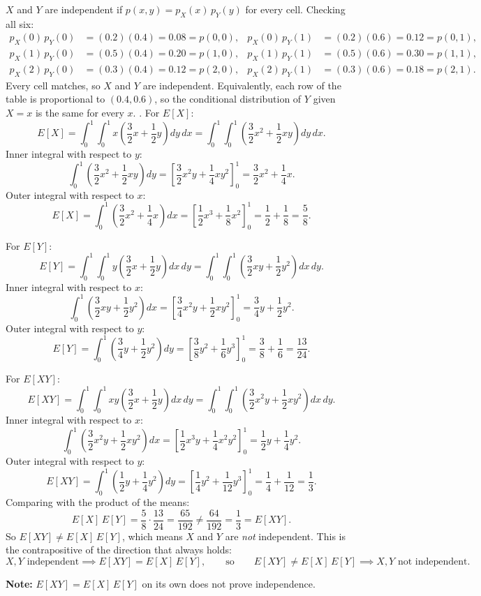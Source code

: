 \documentclass{article}
\begin{document}
$X$ and $Y$ are independent if $p(x, y) = p_X(x) \, p_Y(y)$ for every cell. Checking all six:
\begin{align*}
p_X(0) \, p_Y(0) &= (0.2)(0.4) = 0.08 = p(0, 0), & p_X(0) \, p_Y(1) &= (0.2)(0.6) = 0.12 = p(0, 1), \\
p_X(1) \, p_Y(0) &= (0.5)(0.4) = 0.20 = p(1, 0), & p_X(1) \, p_Y(1) &= (0.5)(0.6) = 0.30 = p(1, 1), \\
p_X(2) \, p_Y(0) &= (0.3)(0.4) = 0.12 = p(2, 0), & p_X(2) \, p_Y(1) &= (0.3)(0.6) = 0.18 = p(2, 1).
\end{align*}
Every cell matches, so $X$ and $Y$ are independent.
Equivalently, each row of the table is proportional to $(0.4, 0.6)$, so the conditional distribution of $Y$ given $X = x$ is the same for every $x$.
. For $E[X]$:
\[
E[X] = \int_0^1 \int_0^1 x \left( \frac{3}{2}x + \frac{1}{2}y \right) dy \, dx = \int_0^1 \int_0^1 \left( \frac{3}{2}x^2 + \frac{1}{2}xy \right) dy \, dx.
\]
Inner integral with respect to $y$:
\[
\int_0^1 \left( \frac{3}{2}x^2 + \frac{1}{2}xy \right) dy = \left[ \frac{3}{2}x^2 y + \frac{1}{4}x y^2 \right]_0^1 = \frac{3}{2}x^2 + \frac{1}{4}x.
\]
Outer integral with respect to $x$:
\[
E[X] = \int_0^1 \left( \frac{3}{2}x^2 + \frac{1}{4}x \right) dx = \left[ \frac{1}{2}x^3 + \frac{1}{8}x^2 \right]_0^1 = \frac{1}{2} + \frac{1}{8} = \frac{5}{8}.
\]

For $E[Y]$:
\[
E[Y] = \int_0^1 \int_0^1 y \left( \frac{3}{2}x + \frac{1}{2}y \right) dx \, dy = \int_0^1 \int_0^1 \left( \frac{3}{2}xy + \frac{1}{2}y^2 \right) dx \, dy.
\]
Inner integral with respect to $x$:
\[
\int_0^1 \left( \frac{3}{2}xy + \frac{1}{2}y^2 \right) dx = \left[ \frac{3}{4}x^2 y + \frac{1}{2}x y^2 \right]_0^1 = \frac{3}{4}y + \frac{1}{2}y^2.
\]
Outer integral with respect to $y$:
\[
E[Y] = \int_0^1 \left( \frac{3}{4}y + \frac{1}{2}y^2 \right) dy = \left[ \frac{3}{8}y^2 + \frac{1}{6}y^3 \right]_0^1 = \frac{3}{8} + \frac{1}{6} = \frac{13}{24}.
\]

For $E[XY]$:
\[
E[XY] = \int_0^1 \int_0^1 xy \left( \frac{3}{2}x + \frac{1}{2}y \right) dx \, dy = \int_0^1 \int_0^1 \left( \frac{3}{2}x^2 y + \frac{1}{2}x y^2 \right) dx \, dy.
\]
Inner integral with respect to $x$:
\[
\int_0^1 \left( \frac{3}{2}x^2 y + \frac{1}{2}x y^2 \right) dx = \left[ \frac{1}{2}x^3 y + \frac{1}{4}x^2 y^2 \right]_0^1 = \frac{1}{2}y + \frac{1}{4}y^2.
\]
Outer integral with respect to $y$:
\[
E[XY] = \int_0^1 \left( \frac{1}{2}y + \frac{1}{4}y^2 \right) dy = \left[ \frac{1}{4}y^2 + \frac{1}{12}y^3 \right]_0^1 = \frac{1}{4} + \frac{1}{12} = \frac{1}{3}.
\]
Comparing with the product of the means:
\[
E[X] \, E[Y] = \frac{5}{8} \cdot \frac{13}{24} = \frac{65}{192} \ne \frac{64}{192} = \frac{1}{3} = E[XY].
\]
So $E[XY] \ne E[X] \, E[Y]$, which means $X$ and $Y$ are \emph{not} independent.
This is the contrapositive of the direction that always holds:
\[
X, Y \text{ independent} \implies E[XY] = E[X] \, E[Y],
\qquad \text{so} \qquad
E[XY] \ne E[X] \, E[Y] \implies X, Y \text{ not independent}.
\]

\textbf{Note:} $E[XY] = E[X] \, E[Y]$ on its own does not prove independence.
\end{document}
